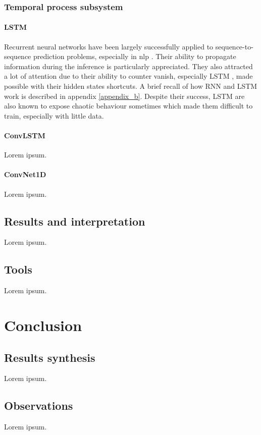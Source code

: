 \documentclass[12pt, a4paper]{report}
\begin{document}
			\subsection{Temporal process subsystem}\label{lstm}
				\subsubsection{LSTM}\label{lstm}
					Recurrent neural networks have been largely successfully applied to sequence-to-sequence prediction problems, especially in \gls{nlp} \cite{wu2016google,shen2018natural,miao2020application}.
					Their ability to propagate information during the inference is particularly appreciated.
					They also attracted a lot of attention due to their ability to counter \gls{vanish}, especially LSTM \cite{Hochreiter1997lstm}, made possible with their hidden states shortcuts.
					A brief recall of how RNN and LSTM work is described in appendix \ref{appendix_b}.
					Despite their success, LSTM are also known to expose chaotic behaviour sometimes \cite{bertschinger2004,laurent2016recurrent} which made them difficult to train, especially with little data.
				\subsubsection{ConvLSTM}
					Lorem ipsum.
				\subsubsection{ConvNet1D}
					Lorem ipsum.
		\section{Results and interpretation}
			Lorem ipsum.
		\section{Tools}
			Lorem ipsum.
	\chapter{Conclusion}
		\section{Results synthesis}
			Lorem ipsum.
		\section{Observations}
			Lorem ipsum.
\end{document}
